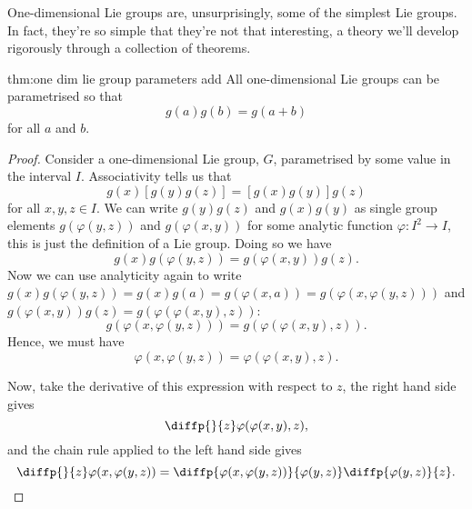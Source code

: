 \documentclass[fleqn]{NotesClass}
\begin{document}
    One-dimensional Lie groups are, unsurprisingly, some of the simplest Lie groups.
    In fact, they're so simple that they're not that interesting, a theory we'll develop rigorously through a collection of theorems.
    
    \begin{thm}{}{thm:one dim lie group parameters add}
        All one-dimensional Lie groups can be parametrised so that
        \begin{equation}
            g(a) g(b) = g(a + b)
        \end{equation}
        for all \(a\) and \(b\).
        \begin{proof}
            Consider a one-dimensional Lie group, \(G\), parametrised by some value in the interval \(I\).
            Associativity tells us that
            \begin{equation}
                g(x) [g(y)g(z)] = [g(x)g(y)]g(z)
            \end{equation}
            for all \(x, y, z \in I\).
            We can write \(g(y)g(z)\) and \(g(x)g(y)\) as single group elements \(g(\varphi(y, z))\) and \(g(\varphi(x, y))\) for some analytic function \(\varphi \colon I^2 \to I\), this is just the definition of a Lie group.
            Doing so we have
            \begin{equation}
                g(x) g(\varphi(y, z)) = g(\varphi(x, y))g(z).
            \end{equation}
            Now we can use analyticity again to write \(g(x)g(\varphi(y, z)) = g(x)g(a) = g(\varphi(x, a)) = g(\varphi(x, \varphi(y, z)))\) and \(g(\varphi(x, y))g(z) = g(\varphi(\varphi(x, y), z))\):
            \begin{equation}
                g(\varphi(x, \varphi(y, z))) = g(\varphi(\varphi(x, y), z)).
            \end{equation}
            Hence, we must have
            \begin{equation}
                \varphi(x, \varphi(y, z)) = \varphi(\varphi(x, y), z).
            \end{equation}
            
            Now, take the derivative of this expression with respect to \(z\), the right hand side gives
            \begin{equation}
                \diffp{}{z}\varphi(\varphi(x, y), z),
            \end{equation}
            and the chain rule applied to the left hand side gives
            \begin{equation}
                \diffp{}{z} \varphi(x, \varphi(y, z)) = \diffp{\varphi(x, \varphi(y, z))}{{\varphi(y, z)}} \diffp{\varphi(y, z)}{z}.
            \end{equation}
            

\end{proof}
\end{thm}
\end{document}
